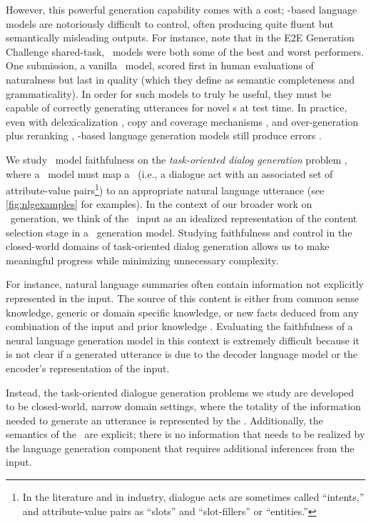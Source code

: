 However, this powerful generation capability comes with a cost;
\deeplearning-based language models are notoriously difficult to control, often
producing quite fluent but  semantically misleading outputs. For instance,
\citet{dusek2020} note that in the E2E Generation Challenge shared-task,
\sequencetosequence~models were both some of the best and worst performers. One
submission, a vanilla \sequencetosequence~model, scored first in human
evaluations of naturalness but last in quality (which they define as semantic
completeness and grammaticality).  In order for such models to truly be useful,
they must be capable of correctly generating utterances for novel
\meaningrepresentation s at test time.  In practice, even with delexicalization
\citep{dusek2016,juraska2018}, copy and coverage mechanisms \citep{elder2018},
and over-generation plus reranking \citep{dusek2016,juraska2018},
\deeplearning-based language generation models still produce errors
\citep{dusek2020}.

We study \sequencetosequence~model faithfulness on the \textit{task-oriented
dialog generation} problem \citep{mairesse2010,wen2015,dusek2018}, where a
\naturallanguagegeneration~model must map a \meaningrepresentation~(i.e., a
dialogue act with an associated set of attribute-value pairs\footnote{In the
literature and in industry, dialogue acts are sometimes called ``intents,'' and
attribute-value pairs as ``slots'' and ``slot-fillers'' or ``entities.''}) to
an appropriate natural language utterance (see \autoref{fig:nlgexamples} for
examples).  In the context of our broader work on \texttotext~generation, we
think of the \meaningrepresentation~input as an idealized representation of the
content selection stage in a \texttotext~generation model.  Studying
faithfulness and control in the closed-world domains of task-oriented dialog
generation allows us to make meaningful progress while minimizing unnecessary
complexity.

For instance, natural language summaries often contain information not
explicitly represented in the input. The source of this content is either from
common sense knowledge, generic or domain specific knowledge, or new facts
deduced from any combination of the input and prior knowledge
\citep{wiseman2017,wang2019}.  Evaluating the faithfulness of a neural language
generation model in this context is extremely difficult because it is not clear
if a generated utterance is due to the decoder language model or the encoder's
representation of the input.

Instead, the task-oriented dialogue generation problems we study are developed
to be closed-world, narrow domain settings, where the totality of the
information needed to generate an utterance is represented by the
\meaningrepresentation. Additionally, the semantics of the
\meaningrepresentation~are explicit; there is no information that needs to be
realized by the language generation component that requires additional
inferences from the input.

